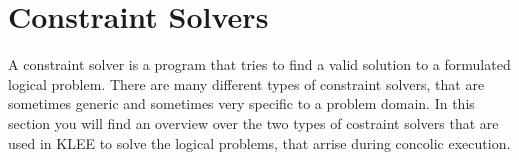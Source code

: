 \section{Constraint Solvers}\label{section:contraint_solvers}
A constraint solver is a program that tries to find a valid solution to a formulated logical problem. 
There are many different types of constraint solvers, that are sometimes generic and sometimes very specific to a problem domain.
In this section you will find an overview over the two types of costraint solvers that are used in KLEE to solve the logical problems, that arrise during concolic execution.

